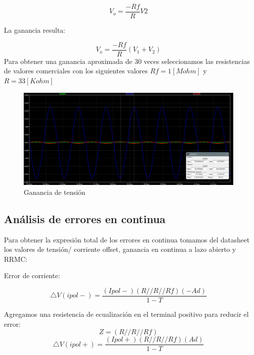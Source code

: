 \documentclass[12pt]{article}
\begin{document}
	\begin{equation}
		V_{o}=\frac{-Rf}{R}V2
	\end{equation}
	
	La ganancia resulta:
	
	\begin{equation}
		V_{o}=\frac{-Rf}{R}(V_{1}+V_{2})
	\end{equation}
	Para obtener una ganancia aproximada de 30 veces seleccionamos las resistencias de valores comerciales con los siguientes valores $Rf=1[Mohm]$ y $R=33[Kohm]$
	
	\begin{figure}[h]
		\includegraphics[width=\linewidth]{Imagenes_simulaciones/Sim_V1_0.1__V2_0.02}
		\caption[Ganancia de tensión]{Ganancia de tensión}
		\label{fig:simv10}
	\end{figure}
	
	\subsection{Análisis de errores en continua}
	Para obtener la expresión total de los errores en continua tomamos del datasheet los valores de tensión/ corriente offset, ganancia en continua a lazo abierto y RRMC:
	
	Error de corriente:
	
	\begin{equation}
		\bigtriangleup V(ipol-) =\frac{(Ipol-)(R//R//Rf)(-Ad)}{1-T}
	\end{equation}
	
	Agregamos una resistencia de ecualización en el terminal positivo para reducir el error:
	\begin{equation}
		Z=(R//R//Rf)
	\end{equation}
	\begin{equation}
			\bigtriangleup V(ipol+) =\frac{(Ipol+)(R//R//Rf)(Ad)}{1-T}
	\end{equation}
\end{document}
